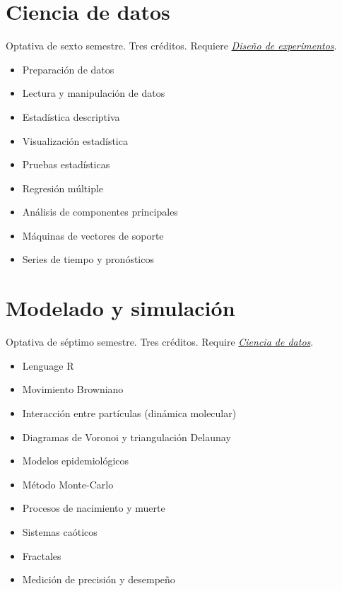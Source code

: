 \documentclass{article}
\begin{document}
\begin{multicols}{4}
\vfill\null \columnbreak

\hypertarget{cdd}{\section*{Ciencia de datos}}   

Optativa de sexto semestre. Tres cr\'{e}ditos. Requiere
\hyperlink{dde}{\em Dise\~{n}o de experimentos}.

\begin{itemize}
\item{Preparaci\'{o}n de datos}
\item{Lectura y manipulaci\'{o}n de datos}
\item{Estad\'{i}stica descriptiva}
\item{Visualizaci\'{o}n estad\'{i}stica}
\item{Pruebas estad\'{i}sticas}
\item{Regresi\'{o}n m\'{u}ltiple}
\item{An\'{a}lisis de componentes principales}
\item{M\'{a}quinas de vectores de soporte}  
\item{Series de tiempo y pron\'{o}sticos}
\end{itemize}

\vfill\null \columnbreak

\hypertarget{mys}{\section*{Modelado y simulaci\'{o}n}}

Optativa de s\'{e}ptimo semestre. Tres cr\'{e}ditos. Require
\hyperlink{cdd}{\em Ciencia de datos}.

\begin{itemize}
\item{Lenguage R}
\item{Movimiento Browniano}
\item{Interacci\'{o}n entre part\'{i}culas (din\'{a}mica molecular)}  
\item{Diagramas de Voronoi y triangulaci\'{o}n Delaunay}  
\item{Modelos epidemiol\'{o}gicos}
\item{M\'{e}todo Monte-Carlo}
\item{Procesos de nacimiento y muerte}
\item{Sistemas ca\'{o}ticos}
\item{Fractales}
\item{Medici\'{o}n de precisi\'{o}n y desempe\~{n}o}
\end{itemize}


\end{multicols}
\end{document}
